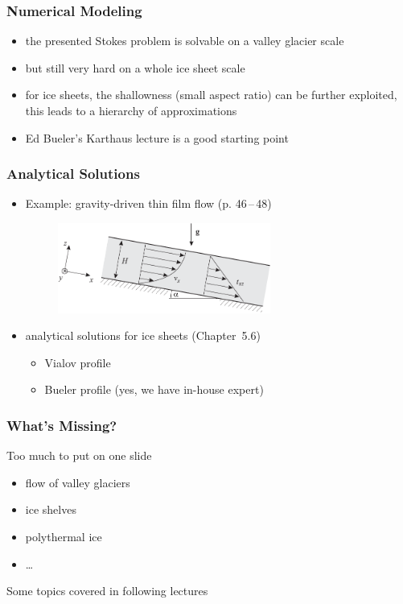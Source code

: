 \documentclass[hide notes,intlimits]{beamer}
\begin{document}
\begin{frame}
  \frametitle{Numerical Modeling}
   \begin{itemize}
   \item the presented Stokes problem is solvable on a valley glacier scale
   \item but still very hard on a whole ice sheet scale
   \item for ice sheets, the shallowness (small aspect ratio) can be further exploited, this leads to a hierarchy of approximations
   \item Ed Bueler's Karthaus lecture is a good starting point
   \end{itemize}
\end{frame}



\begin{frame}
  \frametitle{Analytical Solutions}
   \begin{itemize}
   \item Example: gravity-driven thin film flow (p. 46\,--\,48) 
     \begin{figure}
       \includegraphics[width=7cm]{figures/fig_3_11}
    \end{figure}
   \item analytical solutions for ice sheets (Chapter~5.6)
     \begin{itemize}
     \item Vialov profile
     \item Bueler profile (yes, we have in-house expert)
     \end{itemize}
   \end{itemize}
 \end{frame}
    
\begin{frame}
  \frametitle{What's Missing?}
  Too much to put on one slide
   \begin{itemize}
   \item flow of valley glaciers
   \item ice shelves
   \item polythermal ice
   \item \ldots
   \end{itemize}
   Some topics covered in following lectures
 \end{frame}
    
\end{document}
